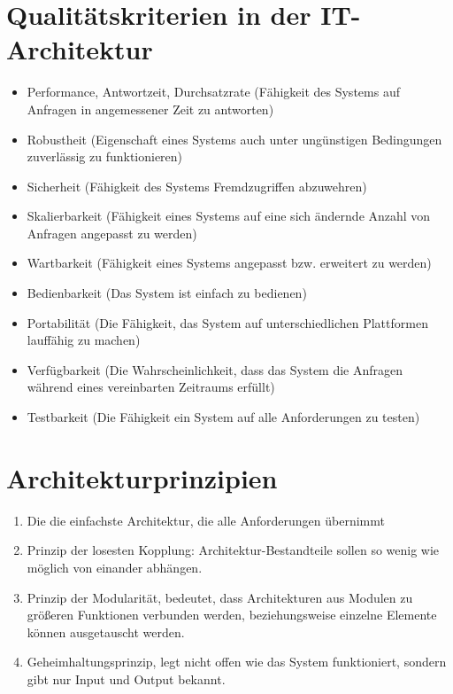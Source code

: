 \section{Qualitätskriterien in der IT-Architektur}
\begin{itemize}
	\item Performance, Antwortzeit, Durchsatzrate (Fähigkeit des Systems auf Anfragen in angemessener Zeit zu antworten)
	\item Robustheit (Eigenschaft eines Systems auch unter ungünstigen Bedingungen zuverlässig zu funktionieren)
	\item Sicherheit (Fähigkeit des Systems Fremdzugriffen abzuwehren)
	\item Skalierbarkeit (Fähigkeit eines Systems auf eine sich ändernde Anzahl von Anfragen angepasst zu werden)
	\item Wartbarkeit (Fähigkeit eines Systems angepasst bzw. erweitert zu werden)
	\item Bedienbarkeit (Das System ist einfach zu bedienen)
	\item Portabilität (Die Fähigkeit, das System auf unterschiedlichen Plattformen lauffähig zu machen)
	\item Verfügbarkeit (Die Wahrscheinlichkeit, dass das System die Anfragen während eines vereinbarten Zeitraums erfüllt)
	\item Testbarkeit (Die Fähigkeit ein System auf alle Anforderungen zu testen)
\end{itemize}

\section{Architekturprinzipien}
\begin{enumerate}
	\item Die die einfachste Architektur, die alle Anforderungen übernimmt
	\item Prinzip der losesten Kopplung: Architektur-Bestandteile sollen so wenig wie möglich von einander abhängen.
	\item Prinzip der Modularität, bedeutet, dass Architekturen aus Modulen zu größeren Funktionen verbunden werden, beziehungsweise einzelne Elemente können ausgetauscht werden.
	\item Geheimhaltungsprinzip, legt nicht offen wie das System funktioniert, sondern gibt nur Input und Output bekannt.
\end{enumerate}